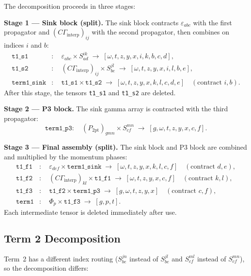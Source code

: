 \documentclass[11pt,a4paper]{article}
\newcommand{\eps}{\varepsilon}
\newcommand{\Gammaint}{\Gamma_{\text{interp}}}
\newcommand{\Cmat}{C}
\begin{document}
The decomposition proceeds in three stages:

\medskip\noindent
\textbf{Stage 1 --- Sink block (split).}
The sink block contracts $\eps_{abc}$ with the first propagator and
$(\Cmat\Gammaint)_{ij}$ with the second propagator, then combines on indices
$i$ and $b$:
\begin{align}
  \texttt{t1\_s1} &: \quad \eps_{abc} \times S^{ik}_{ad}
    \;\to\; [\omega,t,z,y,x,i,k,b,c,d], \\
  \texttt{t1\_s2} &: \quad (\Cmat\Gammaint)_{ij} \times S^{jl}_{be}
    \;\to\; [\omega,t,z,y,x,i,l,b,e], \\
  \texttt{term1\_sink} &: \quad
    \texttt{t1\_s1} \times \texttt{t1\_s2} \;\to\;
    [\omega,t,z,y,x,k,l,c,d,e] \quad (\text{contract } i,b).
\end{align}
After this stage, the tensors \texttt{t1\_s1} and \texttt{t1\_s2} are deleted.

\medskip\noindent
\textbf{Stage 2 --- P3 block.}
The sink gamma array is contracted with the third propagator:
\begin{equation}
  \texttt{term1\_p3}: \quad
    (P_{2\mathrm{pt}})_{gmn} \times S^{mn}_{cf}
    \;\to\; [g,\omega,t,z,y,x,c,f].
\end{equation}

\medskip\noindent
\textbf{Stage 3 --- Final assembly (split).}
The sink block and P3 block are combined and multiplied by the momentum phases:
\begin{align}
  \texttt{t1\_f1} &: \quad
    \eps_{def} \times \texttt{term1\_sink}
    \;\to\; [\omega,t,z,y,x,k,l,c,f] \quad (\text{contract } d,e), \\
  \texttt{t1\_f2} &: \quad
    (\Cmat\Gammaint)_{kl} \times \texttt{t1\_f1}
    \;\to\; [\omega,t,z,y,x,c,f] \quad (\text{contract } k,l), \\
  \texttt{t1\_f3} &: \quad
    \texttt{t1\_f2} \times \texttt{term1\_p3}
    \;\to\; [g,\omega,t,z,y,x] \quad (\text{contract } c,f), \\
  \texttt{term1} &: \quad
    \Phi_p \times \texttt{t1\_f3}
    \;\to\; [g,p,t].
\end{align}
Each intermediate tensor is deleted immediately after use.

\subsection{Term 2 Decomposition}

Term~2 has a different index routing ($S^{jn}_{be}$ instead of $S^{jl}_{be}$ and
$S^{ml}_{cf}$ instead of $S^{mn}_{cf}$), so the decomposition differs:
\end{document}
